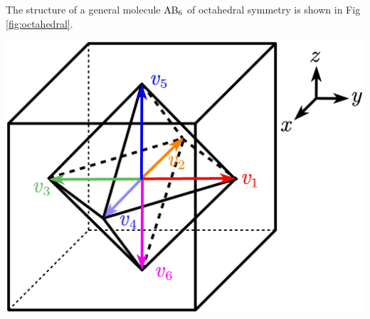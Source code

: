 \documentclass[a4paper]{book}
\newcommand\Figref[1]{Fig \ref{#1}}
\begin{document}
	\begin{solution}
		
		The structure of a general molecule $\ce{AB6}$ of octahedral symmetry is shown in \Figref{fig:octahedral}.
		
		
		\begin{minipage}[t]{1.0\linewidth}
		\begin{center}
		\setlength{\abovecaptionskip}{0.5em}
		\includegraphics[scale=1.5]{./structures/exercise_2/octahedral.png}
		\label{fig:octahedral}
		\end{center}
		\end{minipage}		
		

\end{solution}
\end{document}

